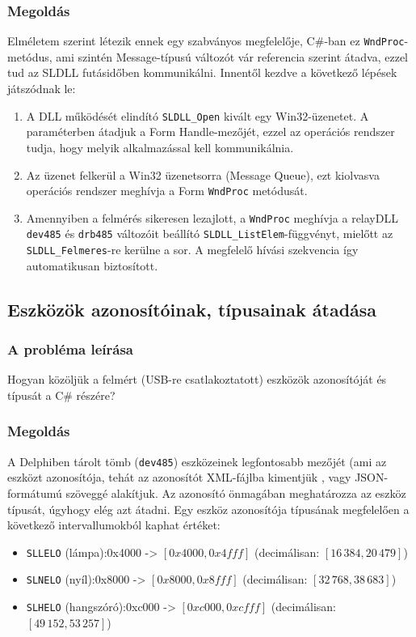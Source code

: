 \documentclass[tocnopagenum]{thesis-ekf}
\begin{document}
	\subsubsection{Megoldás}
	\label{wndproc}
	Elméletem szerint létezik ennek egy szabványos megfelelője, C\#-ban ez \verb*|WndProc|-metódus, ami szintén Message-típusú változót vár referencia szerint átadva, ezzel tud az SLDLL futásidőben kommunikálni.
	Innentől kezdve a következő lépések játszódnak le:
	\begin{enumerate}
		\item A DLL működését elindító \verb*|SLDLL_Open| kivált egy Win32-üzenetet. A paraméterben átadjuk a Form Handle-mezőjét, ezzel az operációs rendszer tudja, hogy melyik alkalmazással kell kommunikálnia.
		\item Az üzenet felkerül a Win32 üzenetsorra (Message Queue), ezt kiolvasva operációs rendszer meghívja a Form \verb*|WndProc| metódusát.
		\item Amennyiben a felmérés sikeresen lezajlott, a \verb*|WndProc| meghívja a relayDLL \verb*|dev485| és \verb*|drb485| változóit beállító \verb*|SLDLL_ListElem|-függvényt, mielőtt az \verb*|SLDLL_Felmeres|-re kerülne a sor. A megfelelő hívási szekvencia így automatikusan biztosított.
	\end{enumerate}
	\subsection{Eszközök azonosítóinak, típusainak átadása}
	\subsubsection{A probléma leírása} Hogyan közöljük a felmért (USB-re csatlakoztatott) eszközök azonosítóját és típusát a C\# részére?
	\subsubsection{Megoldás}
	A Delphiben tárolt tömb (\verb*|dev485|) eszközeinek legfontosabb mezőjét (ami az eszközt azonosítója, tehát az azonosítót XML-fájlba kimentjük \cite{sof_xmlcreate}, vagy JSON-formátumú szöveggé alakítjuk. Az azonosító önmagában meghatározza az eszköz típusát, úgyhogy elég azt átadni.
	Egy eszköz azonosítója típusának megfelelően a következő intervallumokból kaphat értéket:
	\begin{itemize}
		\item \verb*|SLLELO| (lámpa):0x4000 -> $[0x4000,0x4fff]$ (decimálisan: $[16\,384,20\,479]$)
		\item \verb*|SLNELO| (nyíl):0x8000 -> $[0x8000,0x8fff]$ (decimálisan: $[32\,768,38\,683]$)
		\item \verb*|SLHELO| (hangszóró):0xc000 -> $[0xc000,0xcfff]$ (decimálisan: $[49\,152,53\,257]$)
	\end{itemize}
	
\end{document}
